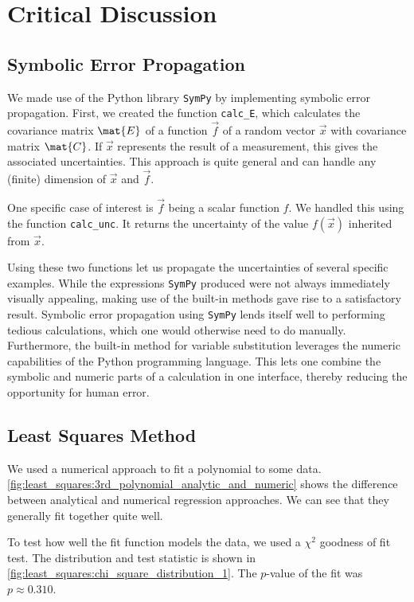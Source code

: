 \section{Critical Discussion}
\label{sec:discussion}

\subsection{Symbolic Error Propagation}
We made use of the Python library \verb|SymPy| by implementing symbolic error propagation.
First, we created the function \verb|calc_E|, which calculates the covariance matrix \( \mat{E} \) of a function \( \vec{f} \) of a random vector \( \vec{x} \) with covariance matrix \( \mat{C} \).
If \( \vec{x} \) represents the result of a measurement, this gives the associated uncertainties.
This approach is quite general and can handle any (finite) dimension of \( \vec{x} \) and \( \vec{f} \).

One specific case of interest is \( \vec{f} \) being a scalar function \( f \).
We handled this using the function \verb|calc_unc|.
It returns the uncertainty of the value \( f(\vec{x}) \) inherited from \( \vec{x} \).

Using these two functions let us propagate the uncertainties of several specific examples.
While the expressions \verb|SymPy| produced were not always immediately visually appealing, making use of the built-in methods gave rise to a satisfactory result.
Symbolic error propagation using \verb|SymPy| lends itself well to performing tedious calculations, which one would otherwise need to do manually.
Furthermore, the built-in method for variable substitution leverages the numeric capabilities of the Python programming language.
This lets one combine the symbolic and numeric parts of a calculation in one interface, thereby reducing the opportunity for human error.

\subsection{Least Squares Method} 

We used a numerical approach to fit a polynomial to some data. \autoref{fig:least_squares:3rd_polynomial_analytic_and_numeric} shows the difference between analytical and numerical regression approaches. We can see that they generally fit together quite well.

To test how well the fit function models the data, we used a \( \chi^2 \) goodness of fit test. The distribution and test statistic is shown in \autoref{fig:least_squares:chi_square_distribution_1}. The \( p \)-value of the fit was \( \boxed{p \approx \num{0.310}} \).

